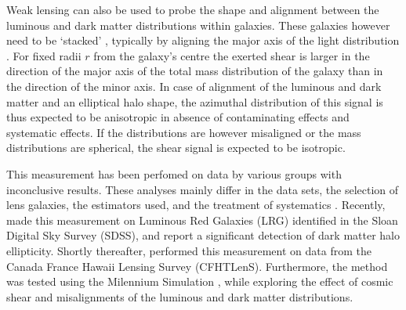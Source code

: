 \documentclass[useAMS,usenatbib]{mn2e}
\begin{document}
Weak lensing can also be used to probe the shape and alignment between the luminous and dark matter distributions within galaxies. These galaxies however need to be `stacked' \citep{2000astro.ph..6281B,2000ApJ...538L.113N}, typically by aligning the major axis of the light distribution \citep[e.g.][]{2004ApJ...606...67H}. For fixed radii $r$ from the galaxy's centre the exerted shear is larger in the direction of the major axis of the total mass distribution of the galaxy than in the direction of the minor axis. In case of alignment of the luminous and dark matter and an elliptical halo shape, the azimuthal distribution of this signal is thus expected to be anisotropic in absence of contaminating effects \citep[e.g. intrinsic alignments][]{2004PhRvD..70f3526H} and systematic effects. If the distributions are however misaligned or the mass distributions are spherical, the shear signal is expected to be isotropic.

This measurement has been perfomed on data by various groups \citep[][]{2004ApJ...606...67H,2006MNRAS.370.1008M,2007ApJ...669...21P,2012A&A...545A..71V} with inconclusive results. These analyses mainly differ in the data sets, the selection of lens galaxies, the estimators used, and the treatment of systematics \citep[see][]{2015arXiv150704301S}. Recently, \citet{2015arXiv150603536C} made this measurement on Luminous Red Galaxies (LRG) identified in the Sloan Digital Sky Survey (SDSS), and report a significant detection of dark matter halo ellipticity. Shortly thereafter, \citet{2015arXiv150704301S} performed this measurement on data from the Canada France Hawaii Lensing Survey (CFHTLenS). Furthermore, the method was tested using the Milennium Simulation \citep{2005Natur.435..629S}, while exploring the effect of cosmic shear and misalignments of the luminous and dark matter distributions.
\end{document}
